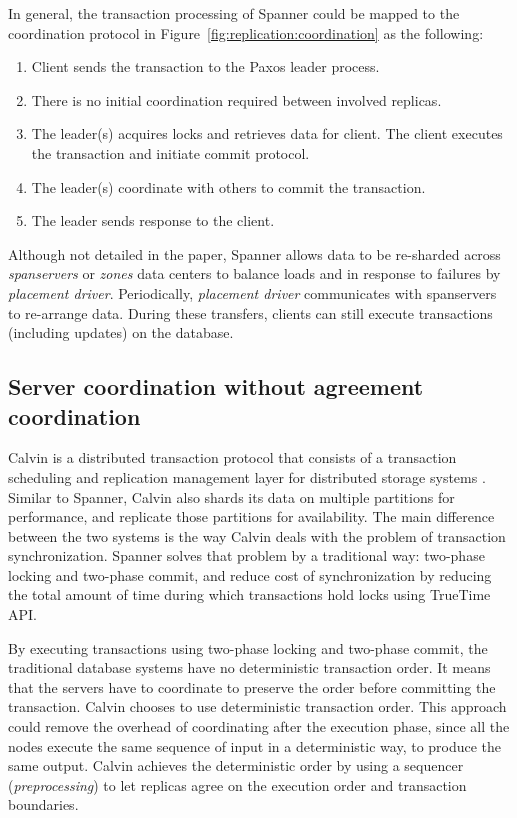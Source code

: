 In general, the transaction processing of Spanner could be mapped to the
coordination protocol in Figure~\ref{fig:replication:coordination} as the
following:
\begin{enumerate}
  \item Client sends the transaction to the Paxos leader process.
  \item There is no initial coordination required between involved replicas.
  \item The leader(s) acquires locks and retrieves data for client. The client
  executes the transaction and initiate commit protocol.
  \item The leader(s) coordinate with others to commit the transaction.
  \item The leader sends response to the client.
\end{enumerate}

Although not detailed in the paper, Spanner allows data to be re-sharded across
\emph{spanservers} or \emph{zones} data centers to balance loads and in response
to failures by \emph{placement driver}. Periodically, \emph{placement driver}
communicates with spanservers to re-arrange data. During these transfers,
clients can still execute transactions (including updates) on the database.

\subsection{Server coordination without agreement coordination}

Calvin is a distributed transaction protocol that consists of a transaction
scheduling and replication management layer for distributed storage systems
\cite{calvin}. Similar to Spanner, Calvin also shards its data on multiple
partitions for performance, and replicate those partitions for availability. The
main difference between the two systems is the way Calvin deals with the problem
of transaction synchronization. Spanner solves that problem by a traditional
way: two-phase locking and two-phase commit, and reduce cost of synchronization
by reducing the total amount of time during which transactions hold locks using
TrueTime API.

By executing transactions using two-phase locking and two-phase commit, the
traditional database systems have no deterministic transaction order. It means
that the servers have to coordinate to preserve the order before committing the
transaction. Calvin chooses to use deterministic transaction order. This
approach could remove the overhead of coordinating after the execution phase,
since all the nodes execute the same sequence of input in a deterministic way,
to produce the same output. Calvin achieves the deterministic order by using
a sequencer (\emph{preprocessing}) to let replicas agree on the execution order and
transaction boundaries.

